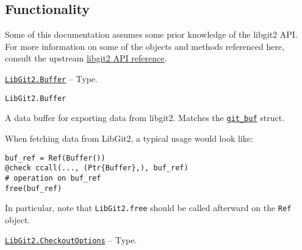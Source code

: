 \hypertarget{13716495418266911399}{}


\subsection{Functionality}



Some of this documentation assumes some prior knowledge of the libgit2 API. For more information on some of the objects and methods referenced here, consult the upstream \href{https://libgit2.org/libgit2/\#v0.25.1}{libgit2 API reference}.


\hypertarget{6862256905288214016}{} 
\hyperlink{6862256905288214016}{\texttt{LibGit2.Buffer}}  -- {Type.}

\begin{adjustwidth}{2em}{0pt}


\begin{verbatim}
LibGit2.Buffer
\end{verbatim}

A data buffer for exporting data from libgit2. Matches the \href{https://libgit2.org/libgit2/\#HEAD/type/git\_buf}{\texttt{git\_buf}} struct.

When fetching data from LibGit2, a typical usage would look like:


\begin{verbatim}
buf_ref = Ref(Buffer())
@check ccall(..., (Ptr{Buffer},), buf_ref)
# operation on buf_ref
free(buf_ref)
\end{verbatim}

In particular, note that \texttt{LibGit2.free} should be called afterward on the \texttt{Ref} object.



\end{adjustwidth}
\hypertarget{16441061243067746546}{} 
\hyperlink{16441061243067746546}{\texttt{LibGit2.CheckoutOptions}}  -- {Type.}

